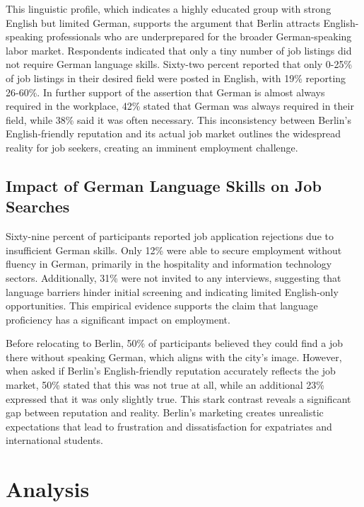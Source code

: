 This linguistic profile, which indicates a highly educated group with strong English but limited German, supports the argument that Berlin attracts English-speaking professionals who are underprepared for the broader German-speaking labor market. Respondents indicated that only a tiny number of job listings did not require German language skills. Sixty-two percent reported that only 0-25\% of job listings in their desired field were posted in English, with 19\% reporting 26-60\%. In further support of the assertion that German is almost always required in the workplace, 42\% stated that German was always required in their field, while 38\% said it was often necessary. This inconsistency between Berlin’s English-friendly reputation and its actual job market outlines the widespread reality for job seekers, creating an imminent employment challenge.


\subsection{Impact of German Language Skills on Job Searches}
Sixty-nine percent of participants reported job application rejections due to insufficient German skills. Only 12\% were able to secure employment without fluency in German, primarily in the hospitality and information technology sectors. Additionally, 31\% were not invited to any interviews, suggesting that language barriers hinder initial screening and indicating limited English-only opportunities. This empirical evidence supports the claim that language proficiency has a significant impact on employment.

Before relocating to Berlin, 50\% of participants believed they could find a job there without speaking German, which aligns with the city’s image. However, when asked if Berlin’s English-friendly reputation accurately reflects the job market, 50\% stated that this was not true at all, while an additional 23\% expressed that it was only slightly true. This stark contrast reveals a significant gap between reputation and reality. Berlin’s marketing creates unrealistic expectations that lead to frustration and dissatisfaction for expatriates and international students.

\section{Analysis}
\blindtext[2]